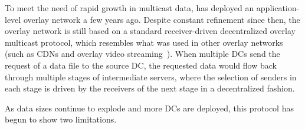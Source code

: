 To meet the need of rapid growth in multicast data, 
\company has deployed an application-level overlay network
a few years ago. 
Despite constant refinement since then, the overlay network 
is still based on a standard receiver-driven decentralized 
overlay multicast protocol, which 
resembles what was used in other overlay networks
(such as CDNs and overlay video 
streaming~\cite{Andreev2013Designing,sripanidkulchai2004analysis,zhang2005coolstreaming}).
When multiple DCs send the request of a data file 
to the source DC, the requested data would flow back 
through multiple stages of
intermediate servers, where the selection of senders in each stage
is driven by the receivers of the next stage in a decentralized
fashion.

As data sizes continue to explode and more DCs are
deployed, this protocol has begun to show two limitations.


